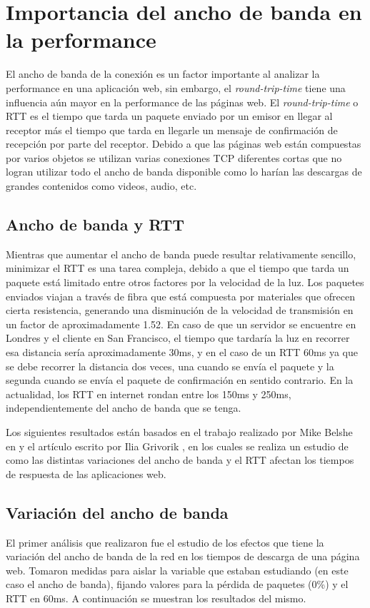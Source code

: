 \section{Importancia del ancho de banda en la performance}
El ancho de banda de la conexión es un factor importante al analizar la performance en una aplicación web, sin embargo, el \emph{round-trip-time} tiene una influencia aún mayor en la performance de las páginas web. El \emph{round-trip-time} o RTT es el tiempo que tarda un paquete enviado por un emisor en llegar al receptor más el tiempo que tarda en llegarle un mensaje de confirmación de recepción por parte del receptor. Debido a que las páginas web están compuestas por varios objetos se utilizan varias conexiones TCP diferentes cortas que no logran utilizar todo el ancho de banda disponible como lo harían
las descargas de grandes contenidos como videos, audio, etc.

\subsection{Ancho de banda y RTT}
Mientras que aumentar el ancho de banda puede resultar relativamente sencillo, minimizar el RTT es una tarea compleja, debido a que el tiempo que tarda un paquete está limitado
entre otros factores por la velocidad de la luz. Los paquetes enviados viajan a través de fibra que está compuesta por materiales que ofrecen cierta resistencia, generando una disminución de la velocidad de transmisión en un factor de aproximadamente 1.52.
En caso de que un servidor se encuentre en Londres y el cliente en San Francisco, el tiempo que tardaría la luz en recorrer esa distancia sería aproximadamente 30ms, y en el caso de un RTT 60ms ya que se debe recorrer la distancia dos veces, una cuando se envía el paquete y la segunda cuando se envía el paquete de confirmación en sentido contrario.
En la actualidad, los RTT en internet rondan entre los 150ms y 250ms, independientemente del ancho de banda que se tenga.

Los siguientes resultados están basados en el trabajo realizado por Mike Belshe en \cite{mike_belshe}  y el
artículo escrito por Ilia Grivorik \cite{grivorik}, en los cuales se realiza un estudio de como las distintas 
variaciones del ancho de banda y el RTT afectan los tiempos de respuesta de las aplicaciones web.

\subsection{Variación del ancho de banda}
El primer análisis que realizaron fue el estudio de los efectos que tiene la variación del ancho de banda de la red en los tiempos de descarga de una página web.
Tomaron medidas para aislar la variable que estaban estudiando (en este caso el ancho de banda), fijando valores para la pérdida de paquetes (0\%) y el RTT en 60ms.
A continuación se muestran los resultados del mismo.

